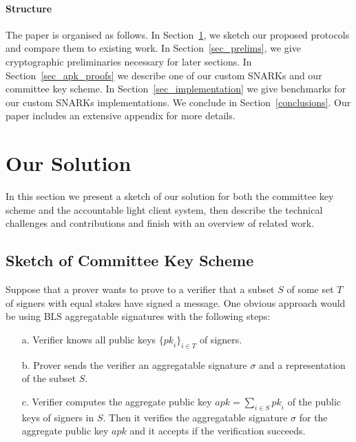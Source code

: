 \paragraph{Structure} The paper is organised as follows.
In Section~\ref{sec:sketch}, we sketch our proposed protocols and compare
them to existing work. In Section~\ref{sec_prelims}, we give cryptographic
preliminaries necessary for later sections. In Section~\ref{sec_apk_proofs}
we describe one of our custom SNARKs and our committee key scheme. In
Section~\ref{sec_implementation} we give benchmarks for our custom SNARKs
implementations. We conclude in Section~\ref{conclusions}. Our paper includes
an extensive appendix for more details.%
\vspace{-0.25cm}
\section{Our Solution}
\label{sec:sketch}
\vspace{-0.1cm}

In this section we present a sketch of our solution for both the committee key scheme and the accountable light client system,
then describe the technical challenges and contributions and finish with an overview of related work.

\vspace{-0.3cm}
\subsection{Sketch of Committee Key Scheme}
\label{sec:lcsketch}
\vspace{-0.1cm}

\noindent Suppose that a prover wants to prove to a verifier that a subset $S$ of some set $T$ of signers with equal stakes have signed a message.
One obvious approach would be using BLS aggregatable signatures with the following steps:

\begin{itemize}
\item[a.] Verifier knows all public keys $\{\mathit{pk}_i\}_{i \in T}$ of signers.%

\item[b.] Prover sends the verifier an aggregatable signature $\sigma$ and a representation of the subset $S$.

\item[c.] Verifier computes the aggregate public key $\mathit{apk}=\sum_{i \in S} \mathit{pk}_i$ of the public keys of signers in $S$.
Then it verifies the aggregatable signature $\sigma$ for the aggregate public key $\mathit{apk}$ and it accepts if the verification succeeds.
\end{itemize}

